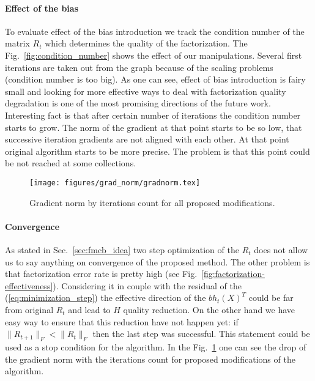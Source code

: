 \documentclass{article}
\begin{document}
\paragraph{Effect of the bias}
To evaluate effect of the bias introduction we track the condition number of the matrix $R_t$ which determines the quality of the factorization. The Fig.~\ref{fig:condition_number} shows the effect of our manipulations. Several first iterations are taken out from the graph because of the scaling problems (condition number is too big). As one can see, effect of bias introduction is fairy small and looking for more effective ways to deal with factorization quality degradation is one of the most promising directions of the future work. Interesting fact is that after certain number of iterations the condition number starts to grow. The norm of the gradient at that point starts to be so low, that successive iteration gradients are not aligned with each other. At that point original algorithm starts to be more precise. The problem is that this point could be not reached at some collections.

\begin{figure}
\vskip 0.2in
\begin{center}
\centerline{\texttt{[image: figures/grad\_norm/gradnorm.tex]}}
\caption{Gradient norm by iterations count for all proposed modifications.}
\end{center}
\label{fig:gradient_norm}
\vskip -0.2in
\end{figure}

\paragraph{Convergence}
As stated in Sec.~\ref{sec:fmcb_idea} two step optimization of the $R_t$ does not allow us to say anything on convergence of the proposed method. The other problem is that factorization error rate is pretty high (see Fig.~\ref{fig:factorization-effectiveness}). Considering it in couple with the residual of the (\ref{eq:minimization_step}) the effective direction of the $b h_t(X)^T$ could be far from original $R_t$ and lead to $H$ quality reduction. On the other hand we have easy way to ensure that this reduction have not happen yet: if $\|R_{t+1}\|_F <\|R_{t}\|_F$ then the last step was successful. This statement could be used as a stop condition for the algorithm. In the Fig.~\ref{fig:gradient_norm} one can see the drop of the gradient norm with the iterations count for proposed modifications of the algorithm.
\end{document}
